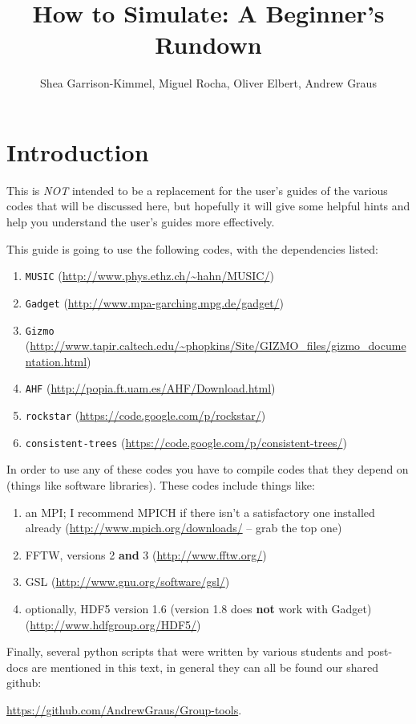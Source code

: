 \documentclass[10pt,a4paper,onecolumn]{article}
\title{How to Simulate:  A Beginner's Rundown}
\author{Shea Garrison-Kimmel, Miguel Rocha, Oliver Elbert, Andrew Graus}
\begin{document}
\maketitle
\section{Introduction}
This is \textit{NOT} intended to be a replacement for the user's guides
of the various codes that will be discussed here, but hopefully it will
give some helpful hints and help you understand the user's guides
more effectively.

This guide is going to use the following codes, with the dependencies
listed:
\begin{enumerate}
\item \texttt{MUSIC} (\url{http://www.phys.ethz.ch/~hahn/MUSIC/})
\item \texttt{Gadget} (\url{http://www.mpa-garching.mpg.de/gadget/})
\item \texttt{Gizmo} (\url{http://www.tapir.caltech.edu/~phopkins/Site/GIZMO_files/gizmo_documentation.html})
\item \texttt{AHF} (\url{http://popia.ft.uam.es/AHF/Download.html})
\item  \texttt{rockstar} (\url{https://code.google.com/p/rockstar/})
\item \texttt{consistent-trees} (\url{https://code.google.com/p/consistent-trees/})
\end{enumerate}
In order to use any of these codes you have to compile codes that they depend on (things like software libraries). These codes include things like:
\begin{enumerate}
\item an MPI; I recommend MPICH if there isn't a satisfactory one installed 
already (\url{http://www.mpich.org/downloads/} -- grab the top one)
\item FFTW, versions 2 \textbf{and} 3 (\url{http://www.fftw.org/})
\item GSL (\url{http://www.gnu.org/software/gsl/})
\item optionally, HDF5 version 1.6 (version 1.8 does \textbf{not} work with Gadget) 
(\url{http://www.hdfgroup.org/HDF5/})
\end{enumerate}

Finally, several python scripts that were written by various students and post-docs are mentioned in this text, in general they can all be found our shared github:

\bigskip
\url{https://github.com/AndrewGraus/Group-tools}. 
\bigskip
\end{document}
